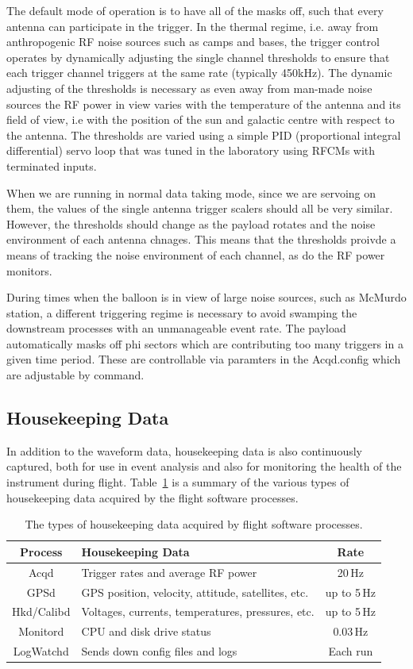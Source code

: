 \documentclass{article}
\begin{document}
The default mode of operation is to have all of the masks off, such that every antenna can participate in the trigger. In the thermal regime, i.e. away from anthropogenic RF noise sources such as camps and bases, the trigger control operates by dynamically adjusting the single channel thresholds to ensure that each trigger channel triggers at the same rate (typically 450kHz). The dynamic adjusting of the thresholds is necessary as even away from man-made noise sources the RF power in view varies with the temperature of the antenna and its field of view, i.e with the position of the sun and galactic centre with respect to the antenna. The thresholds are varied using a simple PID (proportional integral differential) servo loop that was tuned in the laboratory using RFCMs with terminated inputs.

When we are running in normal data taking mode, since we are servoing on them, the values of the single antenna trigger scalers should all be very similar. However, the thresholds should change as the payload rotates and the noise environment of each antenna chnages. This means that the thresholds proivde a means of tracking the noise environment of each channel, as do the RF power monitors.

During times when the balloon is in view of large noise sources, such as McMurdo station, a different triggering regime is necessary to avoid swamping the downstream processes with an unmanageable event rate. The payload automatically masks off phi sectors which are contributing too many triggers in a given time period. These are controllable via paramters in the Acqd.config which are adjustable by command.

\subsection{Housekeeping Data}
In addition to the waveform data, housekeeping data is also continuously captured, both for use in event analysis and also for monitoring the health of the instrument during flight. Table~\ref{t:housekeeping} is a summary of the various types of housekeeping data acquired by the flight software processes.

\begin{table}[hbt]
  \centering
  \begin{tabular}{| c | l | c |}
\hline
    Process & Housekeeping Data & Rate \\
\hline
Acqd & Trigger rates and average RF power & 20\,Hz \\
GPSd & GPS position, velocity, attitude, satellites, etc. & up to 5\,Hz  \\
Hkd/Calibd & Voltages, currents, temperatures, pressures, etc. & up to 5\,Hz \\
Monitord & CPU and disk drive status  & 0.03\,Hz\\
LogWatchd & Sends down config files and logs  & Each run\\
\hline
  \end{tabular}
  \caption{The types of housekeeping data acquired by flight software processes.}
  \label{t:housekeeping}
\end{table}
\end{document}
